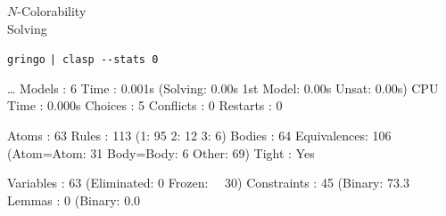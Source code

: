 \begin{frame}[fragile]{$N$-Colorability\\
              \normalsize Solving}
\begin{block}{\alert<1>{\lstinline{gringo}   \lstinline{| clasp --stats 0}}}
\vspace*{-4mm}
\pause\scriptsize%
\begin{semiverbatim}
\dots{}
\alert<3>{Models      : 6}
\alert<3>{Time        : 0.001s} (Solving: 0.00s 1st Model: 0.00s Unsat: 0.00s)
CPU Time    : 0.000s
\alert<3>{Choices     : 5}
\alert<3>{Conflicts   : 0}
\alert<3>{Restarts    : 0}

Atoms       : 63
Rules       : 113    (1: 95 2: 12 3: 6)
Bodies      : 64
Equivalences: 106    (Atom=Atom: 31 Body=Body: 6 Other: 69)
\alert<3>{Tight       : Yes}

\alert<3>{Variables   : 63}     (Eliminated: 0 Frozen: \ \ 30)
\alert<3>{Constraints : 45}     (Binary: 73.3%
Lemmas      : 0      (Binary:  0.0%
\end{semiverbatim}\pause
\end{block}
\end{frame}
